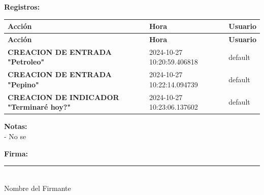 \documentclass[a4paper,10pt]{article}
\begin{document}
\noindent \textbf{Registros:} \\
\begin{longtable}{|p{}|p{}|p{}|}
    \hline
    \textbf{Acción} & \textbf{Hora} & \textbf{Usuario} \\
    \hline
    \endfirsthead
    \hline
    \textbf{Acción} & \textbf{Hora} & \textbf{Usuario} \\
    \hline
    \endhead
    \hline
    \endfoot
\textbf{CREACION DE ENTRADA "Petroleo"} & 2024-10-27 10:20:59.406818 & default \\ 
\textbf{CREACION DE ENTRADA "Pepino"} & 2024-10-27 10:22:14.094739 & default \\ 
\textbf{CREACION DE INDICADOR "Terminaré hoy?"} & 2024-10-27 10:23:06.137602 & default \\ 

\end{longtable}

\vspace{1.5em}

\noindent \textbf{Notas:} \\ - No se \\

\vspace{4em}

\noindent \textbf{Firma:} \\
\rule{5cm}{0.4pt} \\ %
Nombre del Firmante \\
\end{document}
